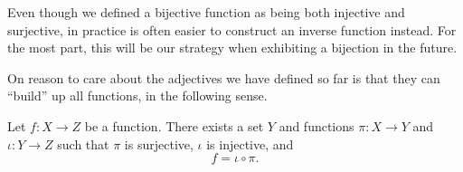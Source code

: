 \documentclass[../main.tex]{subfiles}
\begin{document}
\begin{remark}
    Even though we defined a bijective function as being both injective and surjective, in practice is often easier to construct an inverse function instead. For the most part, this will be our strategy when exhibiting a bijection in the future.
\end{remark}
On reason to care about the adjectives we have defined so far is that they can ``build'' up all functions, in the following sense.
\begin{prop} \label{prop:factor-functions} %
    Let $f\colon X\to Z$ be a function. There exists a set $Y$ and functions $\pi\colon X\to Y$ and $\iota\colon Y\to Z$ such that $\pi$ is surjective, $\iota$ is injective, and
    \[f=\iota\circ\pi.\]
\end{prop}
% 
\end{document}
